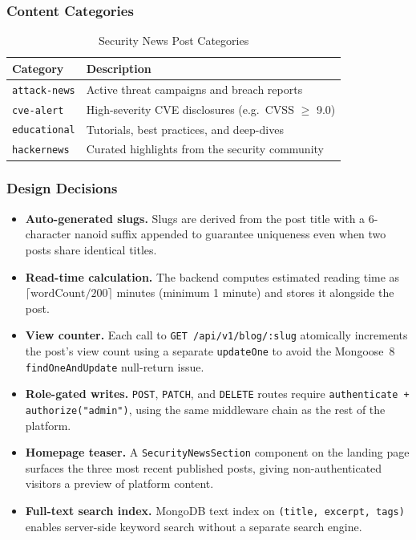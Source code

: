 \documentclass[12pt,a4paper]{report}
\begin{document}
\subsubsection{Content Categories}

\begin{table}[H]
\centering
\caption{Security News Post Categories}
\label{tab:blog_categories}
\begin{tabular}{|l|l|}
\hline
\textbf{Category} & \textbf{Description} \\
\hline
\texttt{attack-news} & Active threat campaigns and breach reports \\
\hline
\texttt{cve-alert} & High-severity CVE disclosures (e.g.\ CVSS $\geq$ 9.0) \\
\hline
\texttt{educational} & Tutorials, best practices, and deep-dives \\
\hline
\texttt{hackernews} & Curated highlights from the security community \\
\hline
\end{tabular}
\end{table}

\subsubsection{Design Decisions}

\begin{itemize}
    \item \textbf{Auto-generated slugs.} Slugs are derived from the post title with a 6-character nanoid suffix appended to guarantee uniqueness even when two posts share identical titles.
    \item \textbf{Read-time calculation.} The backend computes estimated reading time as $\lceil \text{wordCount} / 200 \rceil$ minutes (minimum 1 minute) and stores it alongside the post.
    \item \textbf{View counter.} Each call to \texttt{GET /api/v1/blog/:slug} atomically increments the post's view count using a separate \texttt{updateOne} to avoid the Mongoose~8 \texttt{findOneAndUpdate} null-return issue.
    \item \textbf{Role-gated writes.} \texttt{POST}, \texttt{PATCH}, and \texttt{DELETE} routes require \texttt{authenticate + authorize("admin")}, using the same middleware chain as the rest of the platform.
    \item \textbf{Homepage teaser.} A \texttt{SecurityNewsSection} component on the landing page surfaces the three most recent published posts, giving non-authenticated visitors a preview of platform content.
    \item \textbf{Full-text search index.} MongoDB text index on \texttt{(title, excerpt, tags)} enables server-side keyword search without a separate search engine.
\end{itemize}
\end{document}
